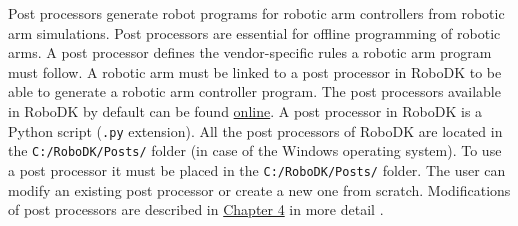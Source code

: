 Post processors generate robot programs for robotic arm controllers from robotic arm simulations. Post processors are essential for offline programming of robotic arms. A post processor defines the vendor-specific rules a robotic arm program must follow. A robotic arm must be linked to a post processor in RoboDK to be able to generate a robotic arm controller program. The post processors available in RoboDK by default can be found \href{https://robodk.com/doc/en/Post-Processors.html#AvailablePosts}{online}.  
A post processor in RoboDK is a Python script (\texttt{.py} extension). All the post processors of RoboDK are located in the
\texttt{C:/RoboDK/Posts/} folder (in case of the Windows operating system).  To use a post processor it must be placed in the \texttt{C:/RoboDK/Posts/} folder. The user can modify an existing post processor or create a new one from scratch. Modifications of post processors are described in \hyperref[chap:implementation]{Chapter 4} in more detail \cite{robodkposts}. 